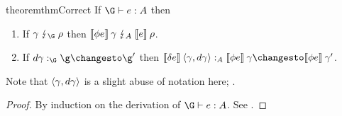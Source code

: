 \begin{restatable}[Correctness]{theorem}{thmCorrect}\label{thm:correct}
  If $\J e \G A$ then

  \begin{enumerate}
  \item If $\gamma \impls_\G \rho$ then \(\den{\phi e} \<\gamma \impls_A \den{e}
    \<\rho\).
  \item If $\changesat{\G}{\dgamma}{\g}{\g'}$ then \(\changesat{A}{\den{\delta
      e} \<\tuple{\gamma,\dgamma}}{\den{\phi e} \<\gamma}{\den{\phi e}
    \<\gamma'}\).
  \end{enumerate}


  \noindent
  Note that $\langle{\gamma,d\gamma}\rangle$ is a slight abuse of notation here;
  .
\end{restatable}
\begin{proof}
  By induction on the derivation of $\J e \G A$. See \XXX.
\end{proof}


